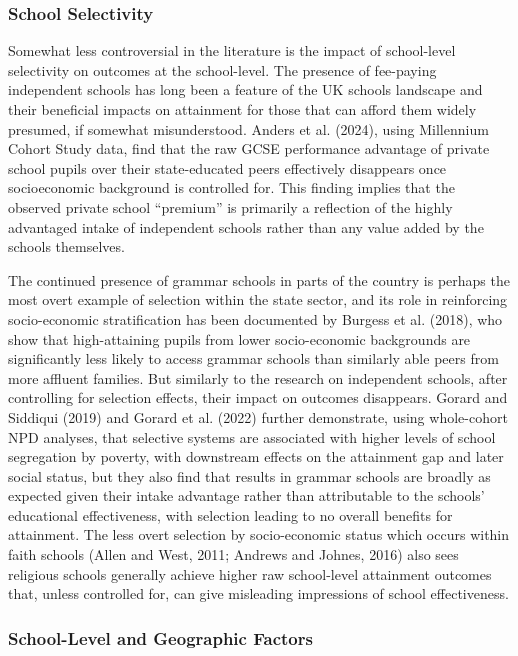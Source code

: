 \documentclass[
  11pt,
]{article}
\begin{document}
\subsubsection{School Selectivity}\label{school-selectivity}

Somewhat less controversial in the literature is the impact of
school-level selectivity on outcomes at the school-level. The presence
of fee-paying independent schools has long been a feature of the UK
schools landscape and their beneficial impacts on attainment for those
that can afford them widely presumed, if somewhat misunderstood. Anders
et al. (2024), using Millennium Cohort Study data, find that the raw
GCSE performance advantage of private school pupils over their
state-educated peers effectively disappears once socioeconomic
background is controlled for. This finding implies that the observed
private school ``premium'' is primarily a reflection of the highly
advantaged intake of independent schools rather than any value added by
the schools themselves.

The continued presence of grammar schools in parts of the country is
perhaps the most overt example of selection within the state sector, and
its role in reinforcing socio-economic stratification has been
documented by Burgess et al. (2018), who show that high-attaining pupils
from lower socio-economic backgrounds are significantly less likely to
access grammar schools than similarly able peers from more affluent
families. But similarly to the research on independent schools, after
controlling for selection effects, their impact on outcomes disappears.
Gorard and Siddiqui (2019) and Gorard et al. (2022) further demonstrate,
using whole-cohort NPD analyses, that selective systems are associated
with higher levels of school segregation by poverty, with downstream
effects on the attainment gap and later social status, but they also
find that results in grammar schools are broadly as expected given their
intake advantage rather than attributable to the schools' educational
effectiveness, with selection leading to no overall benefits for
attainment. The less overt selection by socio-economic status which
occurs within faith schools (Allen and West, 2011; Andrews and Johnes,
2016) also sees religious schools generally achieve higher raw
school-level attainment outcomes that, unless controlled for, can give
misleading impressions of school effectiveness.

\subsubsection{School-Level and Geographic
Factors}\label{school-level-and-geographic-factors}
\end{document}
